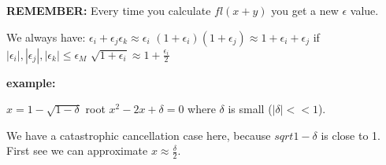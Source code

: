 \documentclass{article}
\newcommand{\n}{\newline}
\begin{document}
\begin{flushleft}
	 \textbf{REMEMBER:} Every time you calculate $fl(x+y)$ you get a new $\epsilon$ value.\n
	 
	 We always have:\n
	 $\epsilon_{i}+\epsilon_{j}\epsilon_{k}\approx\epsilon_{i}$ \n
	 $(1+\epsilon_{i})(1+\epsilon_{j})\approx1+\epsilon_{i}+\epsilon_{j}$ if $|\epsilon_{i}|,|\epsilon_{j}|,|\epsilon_{k}|\leq\epsilon_{M}$ \n
	 $\sqrt{1+\epsilon_{i}}\approx1+\frac{\epsilon_i}{2}$\n
	 
	 \textbf{example: } \n
	 
	 $x=1-\sqrt{1-\delta}$ root $x^{2}-2x+\delta=0$ where $\delta$ is small ($|\delta|<<1$).\n
	 
	 We have a catastrophic cancellation case here, because $sqrt{1-\delta}$ is close to 1.  First see we can approximate $x\approx\frac{\delta}{2}$. 
	 
	 
	
	
	\end{flushleft}
	

	
	
	
	
	

	
\end{document}
